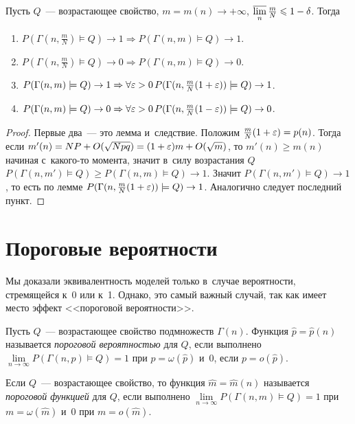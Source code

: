 \documentclass{article}
\begin{document}
\begin{corollary}
	Пусть $Q$~--- возрастающее свойство, $m = m(n) \rightarrow +\infty$,
	$\operatorname*{\overline{lim}}\limits_n \frac{m}{N} \leqslant 1 - \delta$. Тогда
	\begin{enumerate}
		\item $P(\Gamma(n, \frac{m}{N}) \models Q) \rightarrow 1 \Rightarrow
			P(\Gamma(n, m) \models Q) \rightarrow 1$.
		\item $P(\Gamma(n, \frac{m}{N}) \models Q) \rightarrow 0 \Rightarrow
			P(\Gamma(n, m) \models Q) \rightarrow 0$.
		\item $P(\Gamma(n, m) \models Q) \rightarrow 1 \Rightarrow \forall \varepsilon > 0
			\,P(\Gamma(n, \frac{m}{N}(1 + \varepsilon)) \models Q) \rightarrow 1$.
		\item $P(\Gamma(n, m) \models Q) \rightarrow 0 \Rightarrow \forall \varepsilon > 0
			\,P(\Gamma(n, \frac{m}{N}(1 - \varepsilon)) \models Q) \rightarrow 0$.
	\end{enumerate}
\end{corollary}
\begin{proof}
	Первые два~--- это лемма и~следствие. Положим $\frac{m}{N}(1 + \varepsilon) = p(n)$.
	Тогда если $m'(n) = NP + O(\sqrt{Npq}) = (1 + \varepsilon)m + O(\sqrt{m})$, то $m'(n)
	\ge m(n)$ начиная с~какого-то момента, значит в~силу возрастания $Q$
	$P(\Gamma(n, m') \models Q) \ge P(\Gamma(n, m) \models Q) \rightarrow 1$.
	Значит $P(\Gamma(n, m') \models Q) \rightarrow 1$, то есть по лемме
	$P(\Gamma(n, \frac{m}{N}(1 + \varepsilon)) \models Q) \rightarrow 1$. Аналогично
	следует последний пункт.
\end{proof}

\section{Пороговые вероятности}

Мы доказали эквивалентность моделей только в~случае вероятности, стремящейся к~0
или к~1. Однако, это самый важный случай, так как имеет место эффект
<<пороговой вероятности>>.

\begin{definition}
	Пусть $Q$~--- возрастающее свойство подмножеств $\Gamma(n)$. Функция $\hat{p}
	= \hat{p}(n)$ называется \emph{пороговой вероятностью} для $Q$, если выполнено
	$\lim\limits_{n\rightarrow\infty} P(\Gamma(n, p) \models Q) = 1$ при $p =
	\omega(\hat{p})$ и~0, если $p = o(\hat{p})$.
\end{definition}
\begin{definition}
	Если $Q$~--- возрастающее свойство, то функция $\hat{m} = \hat{m}(n)$
	называется \emph{пороговой функцией} для $Q$, если выполнено
	$\lim\limits_{n\rightarrow\infty} P(\Gamma(n, m) \models Q) = 1$ при $m =
	\omega(\hat{m})$ и~0 при $m = o(\hat{m})$.
\end{definition}
\end{document}
